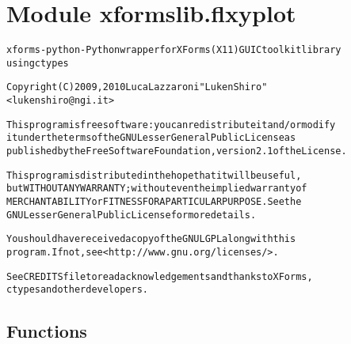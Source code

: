 %
%
%


\section{Module xformslib.flxyplot}

    \label{xformslib:flxyplot}
\begin{alltt}

xforms-python - Python wrapper for XForms (X11) GUI C toolkit library
using ctypes

Copyright (C) 2009, 2010  Luca Lazzaroni "LukenShiro"
    {\textless}lukenshiro@ngi.it{\textgreater}

This program is free software: you can redistribute it and/or modify
it under the terms of the GNU Lesser General Public License as
published by the Free Software Foundation, version 2.1 of the License.

This program is distributed in the hope that it will be useful,
but WITHOUT ANY WARRANTY; without even the implied warranty of
MERCHANTABILITY or FITNESS FOR A PARTICULAR PURPOSE. See the
GNU Lesser General Public License for more details.

You should have received a copy of the GNU LGPL along with this
program. If not, see {\textless}http://www.gnu.org/licenses/{\textgreater}.

See CREDITS file to read acknowledgements and thanks to XForms,
ctypes and other developers.
\end{alltt}



  \subsection{Functions}

    \label{xformslib:flxyplot:fl_add_xyplot}

